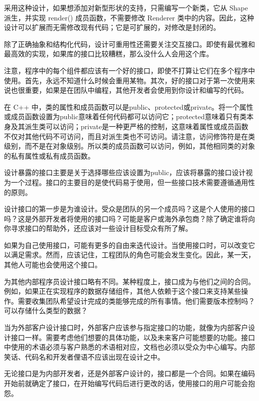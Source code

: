 采用这种设计，如果想添加对新型形状的支持，只需编写一个新类，它从 Shape 派生，并实现 render() 成员函数，不需要修改 Renderer 类中的内容。因此，这种设计可以扩展而无需修改现有代码；它是可扩展的，对修改是封闭的。


除了正确抽象和结构化代码，设计可重用性还需要关注交互接口。即使有最优雅和最高效的实现，如果库的接口比较糟糕，那么没什么人会用这个库。

注意，程序中的每个组件都应该有一个好的接口，即使不打算让它们在多个程序中使用。首先，永远不知道什么时候会重用某物。其次，好的接口对于第一次使用来说也很重要，如果是在团队中编程，其他开发者会使用到你设计和编写的代码。

在 C++ 中，类的属性和成员函数可以是public、protected或private。将一个属性或成员函数设置为public意味着任何代码都可以访问它；protected意味着只有类本身及其派生类可以访问；private是一种更严格的控制，这意味着属性或成员函数不仅对其他代码不可访问，而且对派生类也不可访问。请注意，访问修饰符是在类级别，而不是在对象级别。所以类的成员函数可以访问，例如，其他相同类的对象的私有属性或私有成员函数。

设计暴露的接口主要是关于选择哪些应该设置为public，应该将暴露的接口设计视为一个过程。接口的主要目的是使代码易于使用，但一些接口技术需要遵循通用性的原则。


设计接口的第一步是为谁设计。受众是团队的另一个成员吗？这是个人使用的接口吗？这是外部开发者将使用的接口吗？可能是客户或海外承包商？除了确定谁将向你寻求接口的帮助外，还应该对一些设计目标受众有所了解。

如果为自己使用接口，可能有更多的自由来迭代设计。当使用接口时，可以改变它以满足需求。然而，应该记住，工程团队的角色可能会发生变化。因此，某一天，其他人可能也会使用这个接口。

为其他内部程序员设计接口略有不同。某种程度上，接口成为与他们之间的合同。例如，如果正在实现程序的数据存储组件，其他人依赖于这个接口来支持某些操作。需要收集团队希望设计完成的类能够完成的所有事情。他们需要版本控制吗？可以存储什么类型的数据？

当为外部客户设计接口时，外部客户应该参与指定接口的功能，就像为内部客户设计接口一样。需要考虑他们想要的具体功能，以及未来客户可能想要的功能。接口中使用的术语必须与客户熟悉的术语相对应，文档也必须以受众为中心编写。内部笑话、代码名和开发者俚语不应该出现在设计之中。

无论接口是为内部开发者，还是外部客户设计的，接口都是一个合同。如果在编码开始前就确定了接口，在开始编写代码后进行更改的话，使用接口的用户可能会抱怨。

